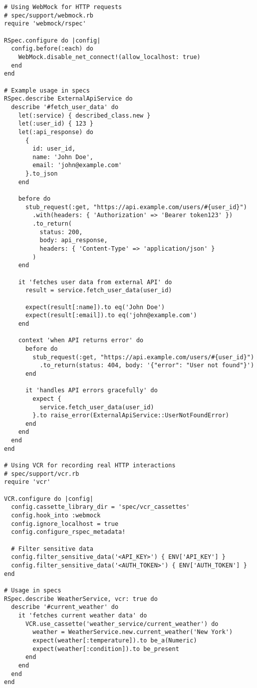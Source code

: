 \documentclass[12pt,a4paper]{article}
\begin{document}
\begin{lstlisting}
# Using WebMock for HTTP requests
# spec/support/webmock.rb
require 'webmock/rspec'

RSpec.configure do |config|
  config.before(:each) do
    WebMock.disable_net_connect!(allow_localhost: true)
  end
end

# Example usage in specs
RSpec.describe ExternalApiService do
  describe '#fetch_user_data' do
    let(:service) { described_class.new }
    let(:user_id) { 123 }
    let(:api_response) do
      {
        id: user_id,
        name: 'John Doe',
        email: 'john@example.com'
      }.to_json
    end

    before do
      stub_request(:get, "https://api.example.com/users/#{user_id}")
        .with(headers: { 'Authorization' => 'Bearer token123' })
        .to_return(
          status: 200,
          body: api_response,
          headers: { 'Content-Type' => 'application/json' }
        )
    end

    it 'fetches user data from external API' do
      result = service.fetch_user_data(user_id)

      expect(result[:name]).to eq('John Doe')
      expect(result[:email]).to eq('john@example.com')
    end

    context 'when API returns error' do
      before do
        stub_request(:get, "https://api.example.com/users/#{user_id}")
          .to_return(status: 404, body: '{"error": "User not found"}')
      end

      it 'handles API errors gracefully' do
        expect {
          service.fetch_user_data(user_id)
        }.to raise_error(ExternalApiService::UserNotFoundError)
      end
    end
  end
end

# Using VCR for recording real HTTP interactions
# spec/support/vcr.rb
require 'vcr'

VCR.configure do |config|
  config.cassette_library_dir = 'spec/vcr_cassettes'
  config.hook_into :webmock
  config.ignore_localhost = true
  config.configure_rspec_metadata!
  
  # Filter sensitive data
  config.filter_sensitive_data('<API_KEY>') { ENV['API_KEY'] }
  config.filter_sensitive_data('<AUTH_TOKEN>') { ENV['AUTH_TOKEN'] }
end

# Usage in specs
RSpec.describe WeatherService, vcr: true do
  describe '#current_weather' do
    it 'fetches current weather data' do
      VCR.use_cassette('weather_service/current_weather') do
        weather = WeatherService.new.current_weather('New York')
        expect(weather[:temperature]).to be_a(Numeric)
        expect(weather[:condition]).to be_present
      end
    end
  end
end
\end{lstlisting}
\end{document}
